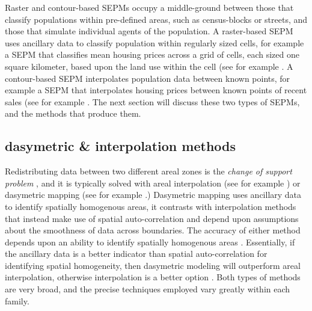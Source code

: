 \documentclass[draft]{article}
\begin{document}
Raster and contour-based SEPMs occupy a middle-ground between those that classify populations within pre-defined areas, such as census-blocks or streets, and those that simulate individual agents of the population.  A raster-based SEPM uses ancillary data to classify population within regularly sized cells, for example a SEPM that classifies mean housing prices across a grid of cells, each sized one square kilometer, based upon the land use within the cell (see for example \cite{eicher01}.  A contour-based SEPM interpolates population data between known points, for example a SEPM that interpolates housing prices between known points of recent sales (see for example \cite{montero11}.  The next section will discuss these two types of SEPMs, and the methods that produce them.


\subsection{dasymetric \& interpolation methods}


Redistributing data between two different areal zones is the {\em change of support problem} \cite{cressie96, gelfand01}, and it is typically solved with areal interpolation (see for example \cite{montero10, montero11}) or dasymetric mapping (see for example \cite{mennis03, bentley13}.)  Dasymetric mapping uses ancillary data to identify spatially homogenous areas, it contrasts with interpolation methods that instead make use of spatial auto-correlation and depend upon assumptions about the smoothness of data across boundaries.  The accuracy of either method depends upon an ability to identify spatially homogenous areas \cite{maantay07, maantay08}.  Essentially, if the ancillary data is a better indicator than spatial auto-correlation for identifying spatial homogeneity, then dasymetric modeling will outperform areal interpolation, otherwise interpolation is a better option \cite{nagle14}.  Both types of methods are very broad, and the precise techniques employed vary greatly within each family.
\end{document}
